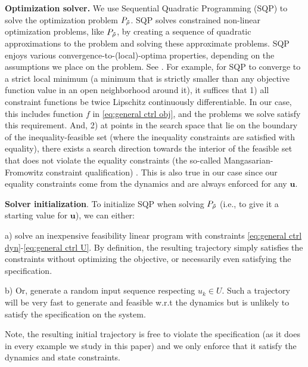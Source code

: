 \textbf{Optimization solver.}
We use Sequential Quadratic Programming (SQP) to solve the optimization problem $P_{\tilde{\rho}}$.
SQP solves constrained non-linear optimization problems, like $P_{\tilde{\rho}}$, by creating a sequence of quadratic approximations to the problem and solving these approximate problems.
SQP enjoys various convergence-to-(local)-optima properties, depending on the assumptions we place on the problem. 
See \cite[Section 2.9]{Polak97_Optim}.
For example, for SQP to converge to a strict local minimum (a minimum that is strictly smaller than any objective function value in an open neighborhood around it), it suffices that 
1) all constraint functions be twice Lipschitz continuously differentiable. 
In our case, this includes function $f$ in \eqref{eq:general ctrl obj}, and the problems we solve satisfy this requirement.
And, 
2) at points in the search space that lie on the boundary of the inequality-feasible set (where the inequality constraints are satisfied with equality), there exists a search direction towards the interior of the feasible set that does not violate the equality constraints (the so-called Mangasarian-Fromowitz constraint qualification) \cite[Assumption 2.9.1]{Polak97_Optim}.
This is also true in our case since our equality constraints come from the dynamics and are always enforced for any $\mathbf{u}$.

\textbf{Solver initialization}.
To initialize SQP when solving $P_{\tilde{\rho}}$ (i.e., to give it a starting value for $\mathbf{u}$), we can either:

a) solve an inexpensive feasibility linear program with constraints \eqref{eq:general ctrl dyn}-\eqref{eq:general ctrl U}. By definition, the resulting trajectory simply satisfies the constraints without optimizing the objective, or necessarily even satisfying the specification.

b) Or, generate a random input sequence respecting $u_k \in U$. 
Such a trajectory will be very fast to generate and feasible w.r.t the dynamics but is unlikely to satisfy the specification on the system. 

Note, the resulting initial trajectory is free to violate the specification (as it does in every example we study in this paper) and we only enforce that it satisfy the dynamics and state constraints.

